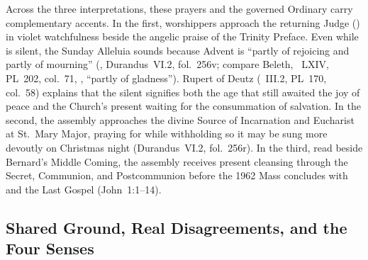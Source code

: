 Across the three interpretations, these prayers and the governed Ordinary carry complementary accents. In the first, worshippers approach the returning Judge () in violet watchfulness beside the angelic praise of the Trinity Preface. Even while  is silent, the Sunday Alleluia sounds because Advent is ``partly of rejoicing and partly of mourning'' (, Durandus~VI.2, fol.~256v; compare Beleth, ~LXIV, PL~202, col.~71, , ``partly of gladness''). Rupert of Deutz (~III.2, PL~170, col.~58) explains that the silent  signifies both the age that still awaited the joy of peace and the Church's present waiting for the consummation of salvation. In the second, the assembly approaches the divine Source of Incarnation and Eucharist at St.~Mary Major, praying for  while withholding  so it may be sung more devoutly on Christmas night (Durandus~VI.2, fol.~256r). In the third, read beside Bernard's Middle Coming, the assembly receives present cleansing through the Secret, Communion, and Postcommunion before the 1962 Mass concludes with  and the Last Gospel (John~1:1--14).

\subsection{Shared Ground, Real Disagreements, and the Four Senses}

